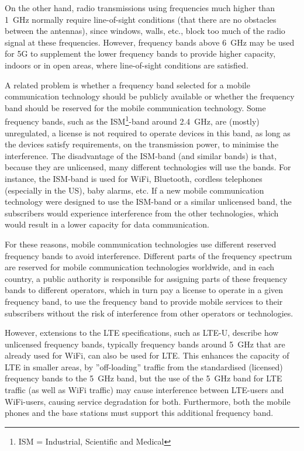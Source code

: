 On the other hand, radio transmissions using frequencies much higher than 1~GHz normally require line-of-sight conditions (\ie that there are no obstacles between the antennas), since windows, walls, etc., block too much of the radio signal at these frequencies. However, frequency bands above 6~GHz may be used for 5G to supplement the lower frequency bands to provide higher capacity, \eg indoors or in open areas, where line-of-sight conditions are satisfied.

A related problem is whether a frequency band selected for a mobile communication technology should be publicly available or whether the frequency band should be reserved for the mobile communication technology. Some frequency bands, such as the ISM\footnote{ISM = Industrial, Scientific and Medical}-band around 2.4~GHz, are (mostly) unregulated, \ie a license is not required to operate devices in this band, as long as the devices satisfy requirements, \eg on the transmission power, to minimise the interference. The disadvantage of the ISM-band (and similar bands) is that, because they are unlicensed, many different technologies will use the bands. For instance, the ISM-band is used for WiFi, Bluetooth, cordless telephones (especially in the US), baby alarms, etc. If a new mobile communication technology were designed to use the ISM-band or a similar unlicensed band, the subscribers would experience interference from the other technologies, which would result in a lower capacity for data communication.

For these reasons, mobile communication technologies use different reserved frequency bands to avoid interference. Different parts of the frequency spectrum are reserved for mobile communication technologies worldwide, and in each country, a public authority is responsible for assigning parts of these frequency bands to different operators, which in turn pay a license to operate in a given frequency band, \ie to use the frequency band to provide mobile services to their subscribers without the risk of interference from other operators or technologies.

However, extensions to the LTE specifications, such as LTE-U, describe how unlicensed frequency bands, typically frequency bands around 5~GHz that are already used for WiFi, can also be used for LTE. This enhances the capacity of LTE in smaller areas, by ''off-loading'' traffic from the standardised (licensed) frequency bands to the 5~GHz band, but the use of the 5~GHz band for LTE traffic (as well as WiFi traffic) may cause interference between LTE-users and WiFi-users, causing service degradation for both. Furthermore, both the mobile phones and the base stations must support this additional frequency band.

